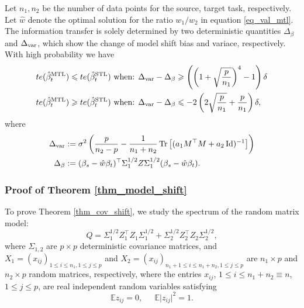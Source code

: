 \begin{theorem}\label{thm_model_shift}
	Let $n_1, n_2$ be the number of data points for the source, target task, respectively.
	Let $\hat{w}$ denote the optimal solution for the ratio $w_1/w_2$ in equation \eqref{eq_val_mtl}.
	The information transfer is solely determined by two deterministic quantities $\Delta_{\beta}$ and $\Delta_{\text{var}}$, which show the change of model shift bias and variace, respectively.
	With high probability we have
	\begin{align}
	 	te(\hat{\beta}_{t}^{\text{MTL}}) \leqslant te(\hat{\beta}_t^{\text{STL}}) \text{ when: } &\Delta_{\text{var}} - \Delta_{\beta} \geqslant \left(\left({1 + \sqrt{\frac{p} {n_1}}}\right)^4 - 1 \right) \delta \label{upper}\\
		te(\hat{\beta}_t^{\text{MTL}}) \geqslant te(\hat{\beta}_t^{\text{STL}}) \text{ when: } &\Delta_{\text{var}} - \Delta_{\beta} \leqslant -2\left({2\sqrt{\frac {p}{n_1}} + \frac{p}{n_1}}\right) \delta, \label{lower}
	\end{align}
	where
	\begin{align*} %
		\Delta_{\vari} &\define {\sigma^2}\bigbrace{\frac{p}{n_2 - p} -  \frac{1}{n_1 + n_2} \bigtr{(a_1 M^{\top}M + a_2\id)^{-1}} } \\
		\Delta_{\beta} &\define (\beta_s - \hat{w}\beta_t)^{\top} \Sigma_1^{1/2} Z \Sigma_1^{1/2} (\beta_s - \hat{w}\beta_t).
	\end{align*}
\end{theorem}



\subsubsection{Proof of Theorem \ref{thm_model_shift}}\label{sec_pfmain}

\noindent{}
To prove Theorem \ref{thm_cov_shift}, we study the spectrum of the random matrix model:
$$Q= \Sigma_1^{1/2}  Z_1^{\top} Z_1 \Sigma_1^{1/2}  + \Sigma_2^{1/2}  Z_2^{\top} Z_2 \Sigma_2^{1/2} ,$$
where $\Sigma_{1,2}$ are $p\times p$ deterministic covariance matrices, and $X_1=(x_{ij})_{1\le i \le n_1, 1\le j \le p}$ and $X_2=(x_{ij})_{n_1+1\le i \le n_1+n_2, 1\le j \le p}$ are $n_1\times p$ and $n_2 \times p$ random matrices, respectively, where the entries $x_{ij}$, $1 \leq i \leq n_1+n_2\equiv n$, $1 \leq j \leq p$, are real independent random variables satisfying
\begin{equation}\label{eq_12moment} %
\mathbb{E} z_{ij} =0, \ \quad \ \mathbb{E} \vert z_{ij} \vert^2  = 1.
\end{equation}


